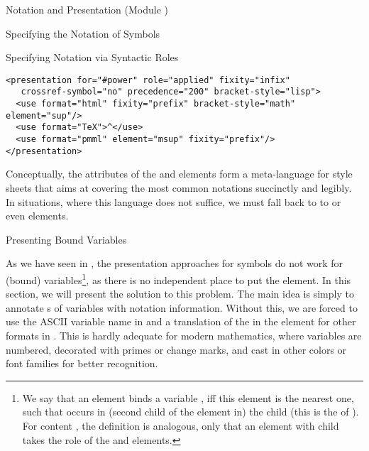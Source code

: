 \begin{tchapter}[id=pres,short=Notation and Presentation]{Notation and Presentation (Module {})}
\begin{tsection}[id=presentation,short=Notation of Symbols]{Specifying the Notation of Symbols}
\begin{tsubsection}[id=pres-declarative]{Specifying Notation via Syntactic Roles}
\begin{lstlisting}[label=lst:binomial,
  caption={Presentation for Binomial Coefficients},
  index={presentation,use}]
<presentation for="#power" role="applied" fixity="infix" 
   crossref-symbol="no" precedence="200" bracket-style="lisp">
  <use format="html" fixity="prefix" bracket-style="math" element="sup"/>
  <use format="TeX">^</use>
  <use format="pmml" element="msup" fixity="prefix"/>
</presentation>
\end{lstlisting}  

Conceptually, the attributes of the {} and {}
elements form a meta-language for {\xslt} style sheets that aims at covering the
most common notations succinctly and legibly. In situations, where this language
does not suffice, we must fall back to to {} or even
{} elements.
\end{tsubsection}
\end{tsection}

\begin{tsection}[id=pres-bound]{Presenting Bound Variables}
  
  As we have seen in {}, the presentation approaches for symbols do not
  work for (bound) variables\footnote{We say that an
    {} element binds a variable {}, iff this {} element is the nearest one,
    such that {} occurs in (second child of the
    {} element in) the {} child
    (this is the {} of {}). For
    content {\mathml}, the definition is analogous, only that an
    {} element with {} child takes the
    role of the {} and {}
    elements.}, as there is no independent place to put the {}
  element. In this section, we will present the {\omdoc} solution to this problem. The
  main idea is simply to annotate {s} of variables with
  notation information. Without this, we are forced to use the ASCII variable name in
  {\openmath} and a translation of the {\pmathml} in the {} element
  for other formats in {\mathml}. This is hardly adequate for modern mathematics, where
  variables are numbered, decorated with primes or change marks, and cast in other colors
  or font families for better recognition.
  

\end{tsection}
\end{tchapter}
